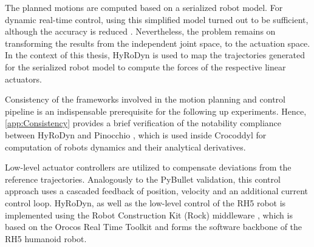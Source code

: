 The planned motions are computed based on a serialized robot model. For dynamic real-time control, using this simplified model turned out to be sufficient, although the accuracy is reduced \cite{kumar2019model}. Nevertheless, the problem remains on transforming the results from the independent joint space, to the actuation space. In the context of this thesis, HyRoDyn is used to map the trajectories generated for the serialized robot model to compute the forces of the respective linear actuators.

Consistency of the frameworks involved in the motion planning and control pipeline is an indispensable prerequisite for the following up experiments. Hence, \cref{app:Consistency} provides a brief verification of the notability compliance between HyRoDyn and Pinocchio \cite{carpentier2019pinocchio}, which is used inside Crocoddyl for computation of robots dynamics and their analytical derivatives. 

Low-level actuator controllers are utilized to compensate deviations from the reference trajectories. Analogously to the PyBullet validation, this control approach uses a cascaded feedback of position, velocity and an additional current control loop. 
HyRoDyn, as well as the low-level control of the RH5 robot is implemented using the Robot Construction Kit (Rock) middleware \cite{joyeux2013rock}, which is based on the Orocos Real Time Toolkit and forms the software backbone of the RH5 humanoid robot. 

